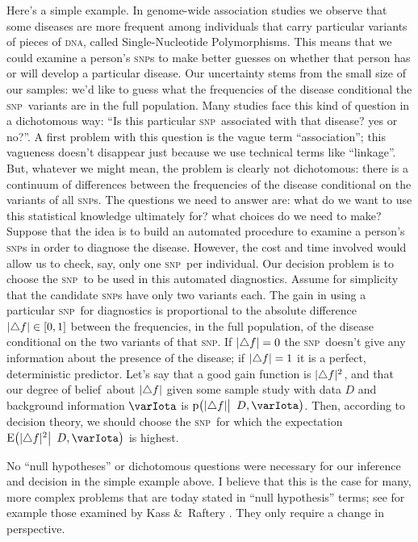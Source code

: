 \documentclass[\ifafour a4paper,12pt,\else a5paper,10pt,\fi%
onecolumn,oneside,article,%
british%
]{memoir}
\theoremstyle{remark}
\theoremstyle{innote}
\newcommand*{\citey}{\parencites*}
\newcommand*{\amp}{\&}
\newcommand*{\incr}{\triangle}%
\DeclarePairedDelimiter\clcl{[}{]}
\DeclarePairedDelimiter\abs{\lvert}{\rvert}
\newcommand*{\pf}{\mathrm{p}}%
\renewcommand*{\|}{\mathpunct{|}}
\newcommand*{\lcond}[1][]{\mathpunct{#1|\ }}%
\newcommand*{\sect}{\S}%
\newcommand*{\E}{\mathrm{E}}
\DeclarePairedDelimiter\expp{(}{)}
\newcommand*{\expe}{\E\expp}%
\newcommand*{\dob}{degree of belief}
\newcommand*{\yI}{\varIota}
\newcommand*{\yD}{D}
\newcommand*{\snp}{\textsc{snp}}
\begin{document}
Here's a simple example. In genome-wide association studies we observe that
some diseases are more frequent among individuals that carry particular
variants of pieces of \textsc{dna}, called Single-Nucleotide Polymorphisms.
This means that we could examine a person's \snp s to make better guesses
on whether that person has or will develop a particular disease. Our
uncertainty stems from the small size of our samples: we'd like to guess
what the frequencies of the disease conditional the \snp\ variants are in
the full population. Many studies face this kind of question in a
dichotomous way: \enquote{Is this particular \snp\ associated with that
  disease? yes or no?}. A first problem with this question is the vague
term \enquote{association}; this vagueness doesn't disappear just because
we use technical terms like \enquote{linkage}. But, whatever we might mean,
the problem is clearly not dichotomous: there is a continuum of differences
between the frequencies of the disease conditional on the variants of all
\snp s. The questions we need to answer are: what do we want to use this
statistical knowledge ultimately for? what choices do we need to make?
Suppose that the idea is to build an automated procedure to examine a
person's \snp s in order to diagnose the disease. However, the cost and
time involved would allow us to check, say, only one \snp\ per individual.
Our decision problem is to choose the \snp\ to be used in this automated
diagnostics. Assume for simplicity that the candidate \snp s have only two
variants each. The gain in using a particular \snp\ for diagnostics is
proportional to the absolute difference $\abs{\incr f} \in \clcl{0,1}$
between the frequencies, in the full population, of the disease conditional
on the two variants of that \snp. If $\abs{\incr f} = 0$ the \snp\ doesn't
give any information about the presence of the disease; if
$\abs{\incr f} = 1$ it is a perfect, deterministic predictor. Let's say
that a good gain function is $\abs{\incr f}^2$, and that our \dob\ about
$\abs{\incr f}$ given some sample study with data $\yD$ and background
information $\yI$ is $\pf\bigl(\abs{\incr f} \lcond[\big] \yD, \yI\bigr)$.
Then, according to decision theory, we should choose the \snp\ for which the
expectation $\expe[\big]{\abs{\incr f}^2 \lcond[\big] \yD, \yI}$ is highest.

No \enquote{null hypotheses} or dichotomous questions were necessary for
our inference and decision in the simple example above. I believe that this
is the case for many, more complex problems that are today stated in
\enquote{null hypothesis} terms; see for example those examined by Kass
\amp\ Raftery \citey[\sect~2]{kassetal1995}. They only require a change in
perspective.
\end{document}
